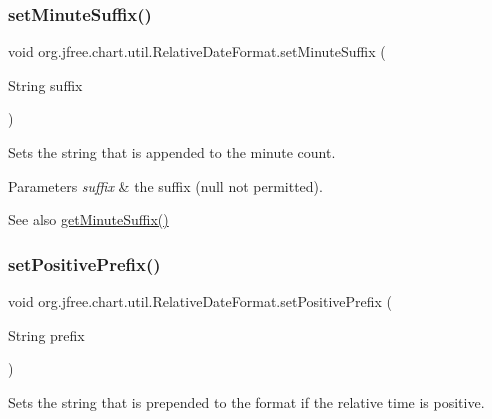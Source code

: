 \subsubsection{\texorpdfstring{set\+Minute\+Suffix()}{setMinuteSuffix()}}
{\footnotesize\ttfamily void org.\+jfree.\+chart.\+util.\+Relative\+Date\+Format.\+set\+Minute\+Suffix (\begin{DoxyParamCaption}\item[{String}]{suffix }\end{DoxyParamCaption})}

Sets the string that is appended to the minute count.


\begin{DoxyParams}{Parameters}
{\em suffix} & the suffix ({\ttfamily null} not permitted).\\
\hline
\end{DoxyParams}
\begin{DoxySeeAlso}{See also}
\mbox{\hyperlink{classorg_1_1jfree_1_1chart_1_1util_1_1_relative_date_format_a9ee421e346664b3818e87c62d637e1f5}{get\+Minute\+Suffix()}} 
\end{DoxySeeAlso}
\mbox{\label{classorg_1_1jfree_1_1chart_1_1util_1_1_relative_date_format_af8a2bab7d176504b80e06476e3c7850c}} 
\subsubsection{\texorpdfstring{set\+Positive\+Prefix()}{setPositivePrefix()}}
{\footnotesize\ttfamily void org.\+jfree.\+chart.\+util.\+Relative\+Date\+Format.\+set\+Positive\+Prefix (\begin{DoxyParamCaption}\item[{String}]{prefix }\end{DoxyParamCaption})}

Sets the string that is prepended to the format if the relative time is positive.


